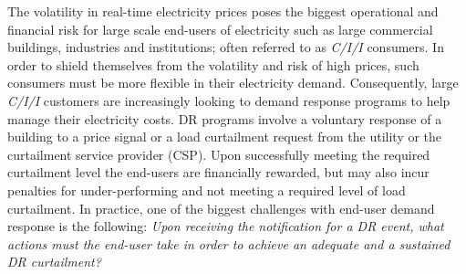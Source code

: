 
The volatility in real-time electricity prices poses the biggest operational and financial risk for large scale end-users of electricity such as large commercial buildings, industries and institutions; often referred to as \textit{C/I/I} consumers. 
In order to shield themselves from the volatility and risk of high prices, such consumers must be more flexible in their electricity demand. 
Consequently, large \textit{C/I/I} customers are increasingly looking to demand response programs to help manage their electricity costs.
DR programs involve a voluntary response of a building to a price signal or a load curtailment request from the utility or the curtailment service provider (CSP). 
Upon successfully meeting the required curtailment level the end-users are financially rewarded, but may also incur penalties for under-performing and not meeting a required level of load curtailment.
In practice, one of the biggest challenges with end-user demand response is the following: \emph{Upon receiving the notification for a DR event, what actions must the end-user take in order to achieve an adequate and a sustained DR curtailment?} 

